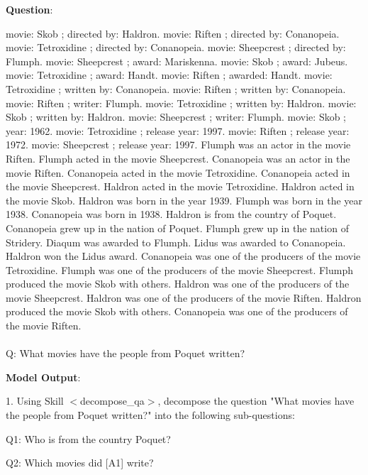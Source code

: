 \documentclass{article} %
\begin{document}
\begin{tcolorbox}[title = {CommaQA-E}, colback = Apricot!25!white, colframe = BrickRed!75!black] 
\textbf{Question}: 

\quad

movie: Skob ; directed by: Haldron. movie: Riften ; directed by: Conanopeia. movie: Tetroxidine ; directed by: Conanopeia. movie: Sheepcrest ; directed by: Flumph. movie: Sheepcrest ; award: Mariskenna. movie: Skob ; award: Jubeus. movie: Tetroxidine ; award: Handt. movie: Riften ; awarded: Handt. movie: Tetroxidine ; written by: Conanopeia. movie: Riften ; written by: Conanopeia. movie: Riften ; writer: Flumph. movie: Tetroxidine ; written by: Haldron. movie: Skob ; written by: Haldron. movie: Sheepcrest ; writer: Flumph. movie: Skob ; year: 1962. movie: Tetroxidine ; release year: 1997. movie: Riften ; release year: 1972. movie: Sheepcrest ; release year: 1997. Flumph was an actor in the movie Riften. Flumph acted in the movie Sheepcrest. Conanopeia was an actor in the movie Riften. Conanopeia acted in the movie Tetroxidine. Conanopeia acted in the movie Sheepcrest. Haldron acted in the movie Tetroxidine. Haldron acted in the movie Skob. Haldron was born in the year 1939. Flumph was born in the year 1938. Conanopeia was born in 1938. Haldron is from the country of Poquet. Conanopeia grew up in the nation of Poquet. Flumph grew up in the nation of Stridery. Diaqum was awarded to Flumph. Lidus was awarded to Conanopeia. Haldron won the Lidus award. Conanopeia was one of the producers of the movie Tetroxidine. Flumph was one of the producers of the movie Sheepcrest. Flumph produced the movie Skob with others. Haldron was one of the producers of the movie Sheepcrest. Haldron was one of the producers of the movie Riften. Haldron produced the movie Skob with others. Conanopeia was one of the producers of the movie Riften. \\ \\

Q: What movies have the people from Poquet written? 


\tcblower
\textbf{Model Output}:

\quad

1. Using Skill $<$decompose\_qa$>$, decompose the question "What movies have the people from Poquet written?" into the following sub-questions: 

\quad

  \qquad  Q1: Who is from the country Poquet? 
  
   \qquad Q2: Which movies did [A1] write? 


\end{tcolorbox}
\end{document}
